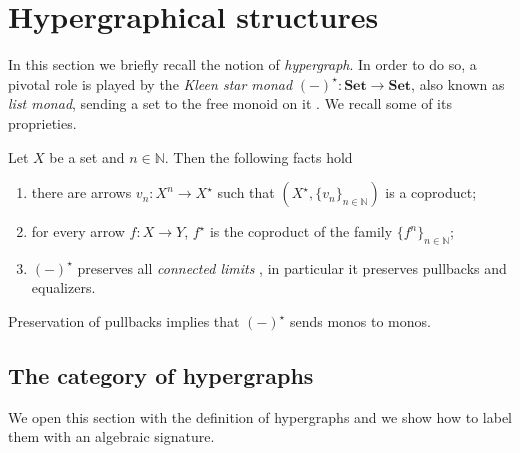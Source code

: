 \documentclass[a4paper,UKenglish,cleveref,pdftex,thm-restate,numberwithinsect]{lipics-v2021}
\newcommand{\lgh}{\mathsf{lg}}
\newcommand{\Set}{\mathbf{Set}}
\def\X{\textbf {\textup{X}}}
\begin{document}
\section{Hypergraphical structures}\label{sec:hyper}

In this section we briefly recall the notion of \emph{hypergraph}. In order to do so, a pivotal role is played by the \emph{Kleen star monad} $(-)^\star\colon \Set\to \Set$, also known as 
\emph{list monad},
sending a set to the free monoid on it \cite{sakarovitch2009elements,Wadler95}.
We recall some of its proprieties.

\begin{proposition}\label{prop:fact}
	Let $X$ be a set and $n\in \mathbb{N}$. Then the following facts hold
	\begin{enumerate}
		\item there are arrows $v_{n}\colon X^n\to X^\star $ such that $(X^\star, \{v_{n}\}_{n\in \mathbb{N}})$ is a coproduct;
		\item for every arrow $f\colon X\to Y$, $f^\star$ is the coproduct of the family $\{f^n\}_{n\in \mathbb{N}}$;
		\item $(-)^\star$ preserves all \emph{connected limits} \cite{carboni1995connected}, in particular it preserves pullbacks and equalizers.
	\end{enumerate}
\end{proposition}

\begin{remark}\label{rem:mono}
	Preservation of pullbacks implies that $(-)^\star$ sends monos to monos.
\end{remark}


\subsection{The category of hypergraphs}

We open this section with the definition of hypergraphs and we show how to label them with an algebraic signature.  
\end{document}
